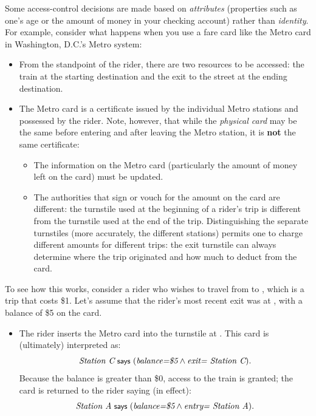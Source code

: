 \begin{exercise}[\synthesis]
  Some access-control decisions are made based on \emph{attributes}
  (properties such as one's age or the amount of money in your checking
  account) rather than \emph{identity}.  For example, consider what
  happens when you use a fare card like the Metro card in Washington,
  D.C.'s Metro system:
  \begin{itemize}
  \item From the standpoint of the rider, there are two resources to be
    accessed: the train at the starting destination and the exit to the
    street at the
    ending destination.

  \item The Metro card is a certificate issued by the individual Metro
    stations and possessed by the rider. Note, however, that while the
    \emph{physical card} may be the same before entering and after
    leaving the Metro station, it is \textbf{not} the same certificate:
    \begin{itemize}
    \item The information on the Metro card (particularly the amount of
      money left on the card) must be updated.
    \item The authorities that sign or vouch for the amount on the card
      are different: the turnstile used at the beginning of a rider's
      trip is different from the turnstile used at the end of the trip.
      Distinguishing the separate turnstiles (more accurately, the
      different stations) permits one to charge different amounts for
      different trips: the exit turnstile can always determine where the
      trip originated and how much to deduct from the card.
    \end{itemize}
  \end{itemize}

  To see how this works, consider a rider who wishes to travel from
   to , which is a trip that costs
  \$1.  Let's assume that the rider's most recent exit was at
  , with a balance of \$5 on the card.
  \begin{itemize}
  \item The rider inserts the Metro card into the turnstile at
    .  This card is (ultimately) interpreted as:
    \[ \textit{Station C} \text{\small\textsf{ says }} (\textit{balance=\$5} \wedge \textit{exit=
      Station C}). \]
    Because the balance is greater than \$0, access to the train is
    granted; the card is returned to the rider saying (in effect): 
    \[ \textit{Station A} \text{\small\textsf{ says }} (\textit{balance=\$5} \wedge \textit{entry=
      Station A}). \]
  

\end{itemize}
\end{exercise}
